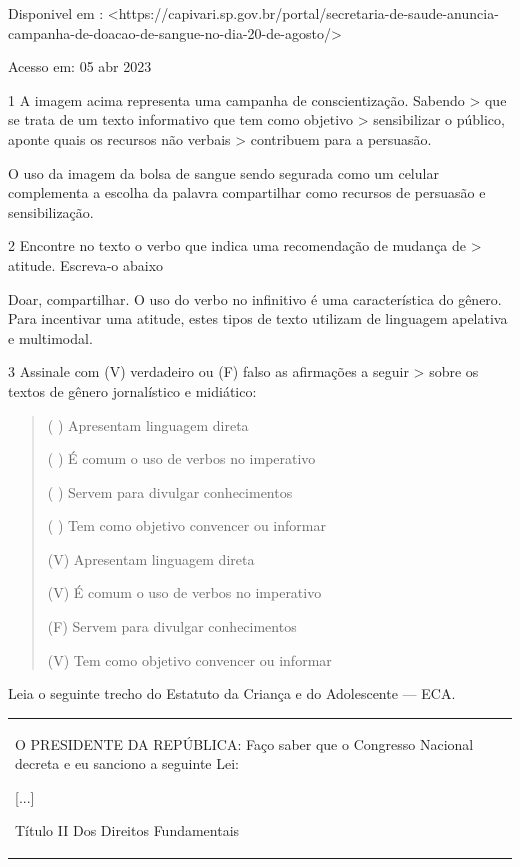 {Disponivel em :
\textless https://capivari.sp.gov.br/portal/secretaria-de-saude-anuncia-campanha-de-doacao-de-sangue-no-dia-20-de-agosto/\textgreater{}

Acesso em: 05 abr 2023

\num{1} A imagem acima representa uma campanha de conscientização. Sabendo \textgreater{} que se trata de um texto informativo que tem como objetivo \textgreater{} sensibilizar o público, aponte quais os recursos não verbais \textgreater{} contribuem para a persuasão.

O uso da imagem da bolsa de sangue sendo segurada como um celular
complementa a escolha da palavra compartilhar como recursos de persuasão
e sensibilização.

\num{2} Encontre no texto o verbo que indica uma recomendação de mudança de \textgreater{} atitude. Escreva-o abaixo

Doar, compartilhar. O uso do verbo no infinitivo é uma característica do
gênero. Para incentivar uma atitude, estes tipos de texto utilizam de
linguagem apelativa e multimodal.

\num{3} Assinale com (V) verdadeiro ou (F) falso as afirmações a seguir \textgreater{} sobre os textos de gênero jornalístico e midiático:

\begin{quote}

( ) Apresentam linguagem direta

( ) É comum o uso de verbos no imperativo

( ) Servem para divulgar conhecimentos

( ) Tem como objetivo convencer ou informar

(V) Apresentam linguagem direta

(V) É comum o uso de verbos no imperativo

(F) Servem para divulgar conhecimentos

(V) Tem como objetivo convencer ou informar
\end{quote}

Leia o seguinte trecho do Estatuto da Criança e do Adolescente --- ECA.

\begin{longtable}[]{@{}
  >{\raggedright\arraybackslash}p{}@{}}
\toprule
\endhead
O PRESIDENTE DA REPÚBLICA: Faço saber que o Congresso Nacional decreta e
eu sanciono a seguinte Lei:

{[}...{]}

Título II Dos Direitos Fundamentais


\end{longtable}}
